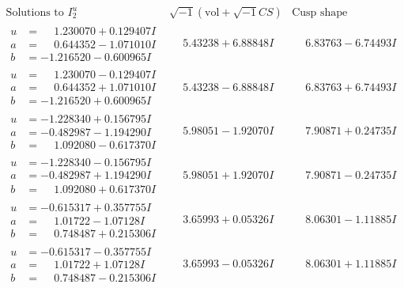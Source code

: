 \documentclass[1p]{elsarticle_modified}
\theoremstyle{definition}
\newcommand{\I}{\sqrt{-1}}
\begin{document}
$$\begin{array}{c|c|c}  
\text{Solutions to }I^u_{2}& \I (\text{vol} + \sqrt{-1}CS) & \text{Cusp shape}\\
 \hline 
\begin{aligned}
u &= \phantom{-}1.230070 + 0.129407 I \\
a &= \phantom{-}0.644352 - 1.071010 I \\
b &= -1.216520 - 0.600965 I\end{aligned}
 & \phantom{-}5.43238 + 6.88848 I & \phantom{-}6.83763 - 6.74493 I \\ \hline\begin{aligned}
u &= \phantom{-}1.230070 - 0.129407 I \\
a &= \phantom{-}0.644352 + 1.071010 I \\
b &= -1.216520 + 0.600965 I\end{aligned}
 & \phantom{-}5.43238 - 6.88848 I & \phantom{-}6.83763 + 6.74493 I \\ \hline\begin{aligned}
u &= -1.228340 + 0.156795 I \\
a &= -0.482987 - 1.194290 I \\
b &= \phantom{-}1.092080 - 0.617370 I\end{aligned}
 & \phantom{-}5.98051 - 1.92070 I & \phantom{-}7.90871 + 0.24735 I \\ \hline\begin{aligned}
u &= -1.228340 - 0.156795 I \\
a &= -0.482987 + 1.194290 I \\
b &= \phantom{-}1.092080 + 0.617370 I\end{aligned}
 & \phantom{-}5.98051 + 1.92070 I & \phantom{-}7.90871 - 0.24735 I \\ \hline\begin{aligned}
u &= -0.615317 + 0.357755 I \\
a &= \phantom{-}1.01722 - 1.07128 I \\
b &= \phantom{-}0.748487 + 0.215306 I\end{aligned}
 & \phantom{-}3.65993 + 0.05326 I & \phantom{-}8.06301 - 1.11885 I \\ \hline\begin{aligned}
u &= -0.615317 - 0.357755 I \\
a &= \phantom{-}1.01722 + 1.07128 I \\
b &= \phantom{-}0.748487 - 0.215306 I\end{aligned}
 & \phantom{-}3.65993 - 0.05326 I & \phantom{-}8.06301 + 1.11885 I \\ \hline\begin{aligned}

\end{aligned}
\end{array}$$
\end{document}
